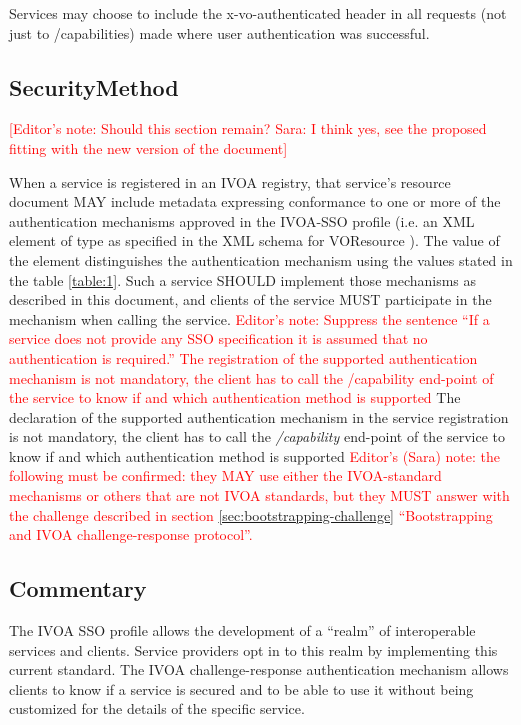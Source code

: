\documentclass[11pt,a4paper]{ivoa}
\begin{document}
Services may choose to include the x-vo-authenticated header in all
requests (not just to /capabilities) made where user authentication was
successful.

\subsection{SecurityMethod}

\textcolor{red}{[Editor's note: Should this section remain? Sara: I 
think yes, see the proposed fitting with the new version of the 
document]}

When a service is registered in an IVOA registry, that service's
resource document MAY include metadata expressing conformance to one or
more of the authentication mechanisms approved in the IVOA-SSO profile 
(i.e. an XML element
of type  as specified in the XML schema for
VOResource \citep{2018ivoa.spec.0625P}). 
The value of the element 
distinguishes the authentication mechanism using the values stated in
the table  \ref{table:1}.
Such a service SHOULD implement those mechanisms as described in this
document, and clients of the service MUST participate in the mechanism
when calling the service. 
\textcolor{red}{Editor's note: Suppress the sentence ``If a service does
not provide any SSO specification it is assumed that no authentication 
is required.'' The registration of the supported authentication
mechanism is not mandatory, the client has to call the /capability 
end-point of the service to know if and which authentication method is 
supported} The declaration of the supported authentication mechanism in 
the service registration is not mandatory, the client has to call the 
\emph{/capability} end-point 
of the service to know if and which authentication method is supported
\textcolor{red}{Editor's (Sara) note: the following must be confirmed:
they MAY use either the IVOA-standard mechanisms or
others that are not IVOA standards, but they MUST answer with the
challenge described in section \ref{sec:bootstrapping-challenge} 
``Bootstrapping and IVOA challenge-response protocol''.}

\subsection{Commentary}
The IVOA SSO profile allows the development of a ``realm'' of
interoperable services and clients.
Service providers opt in to this realm by implementing this current
standard.
The IVOA challenge-response authentication mechanism allows clients to
know if a service is secured and to be able to use it without
being customized for the details of the specific service.
\end{document}
